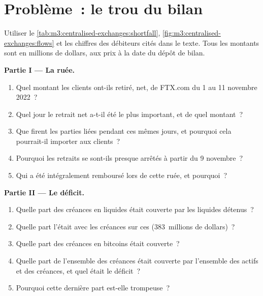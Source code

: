 \section{Problème~: le trou du bilan}

\begin{problem}\label{pb:m3:centralised-exchanges:1}
Utiliser le \cref{tab:m3:centralised-exchanges:shortfall}, \cref{fig:m3:centralised-exchanges:flows} et les
chiffres des débiteurs cités dans le texte. Tous les montants sont en millions de dollars, aux prix à la date du dépôt de bilan.

\medskip\noindent\textbf{Partie I --- La ruée.}
\begin{enumerate}
\item Quel montant les clients ont-ils retiré, net, de FTX.com du 1 au 11 novembre 2022~?
\item Quel jour le retrait net a-t-il été le plus important, et de quel montant~?
\item Que firent les parties liées pendant ces mêmes jours, et pourquoi cela pourrait-il importer aux clients~?
\item Pourquoi les retraits se sont-ils presque arrêtés à partir du 9 novembre~?
\item Qui a été intégralement remboursé lors de cette ruée, et pourquoi~?
\end{enumerate}

\medskip\noindent\textbf{Partie II --- Le déficit.}
\begin{enumerate}[resume]
\item Quelle part des créances en  liquides était couverte par les  liquides détenus~?
\item Quelle part l'était avec les créances sur ces  (383~millions de dollars)~?
\item Quelle part des créances en bitcoins était couverte~?
\item Quelle part de l'ensemble des créances était couverte par l'ensemble des actifs et des créances, et quel était le déficit~?
\item Pourquoi cette dernière part est-elle trompeuse~?
\end{enumerate}


\end{problem}
